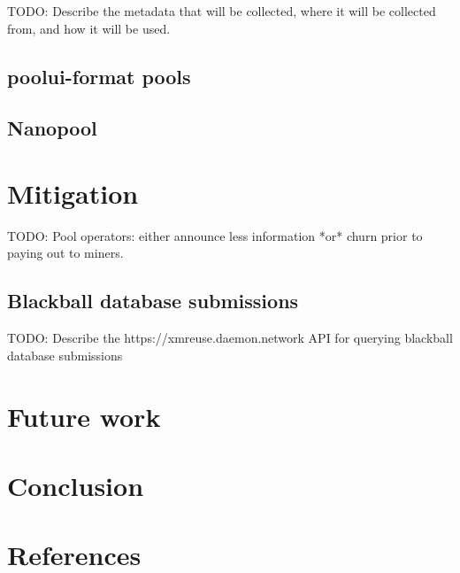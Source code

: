 \documentclass[notitlepage]{report}
\begin{document}
TODO: Describe the metadata that will be collected, where it will be collected from, and how it will be used.

\subsection{poolui-format pools}

\subsection{Nanopool}

\section{Mitigation}

TODO: Pool operators: either announce less information *or* churn prior to paying out to miners.

\subsection{Blackball database submissions}

TODO: Describe the https://xmreuse.daemon.network API for querying blackball database submissions

\section{Future work}

\section{Conclusion}

\section{References}
\end{document}
